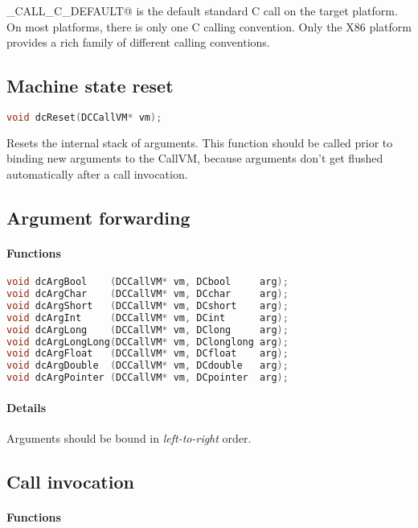 \lstinline@DC_CALL_C_DEFAULT@ is the default standard C call on the target platform.
On most platforms, there is only one C calling convention. Only the X86 platform
provides a rich family of different calling conventions.


\subsection{Machine state reset}

\begin{lstlisting}[language=c]
void dcReset(DCCallVM* vm);
\end{lstlisting}

Resets the internal stack of arguments. This function should be called prior 
to binding new arguments to the CallVM, because arguments don't get flushed
automatically after a call invocation.


\subsection{Argument forwarding}

\paragraph{Functions}

\begin{lstlisting}[language=c]
void dcArgBool    (DCCallVM* vm, DCbool     arg);
void dcArgChar    (DCCallVM* vm, DCchar     arg);
void dcArgShort   (DCCallVM* vm, DCshort    arg);
void dcArgInt     (DCCallVM* vm, DCint      arg);
void dcArgLong    (DCCallVM* vm, DClong     arg);
void dcArgLongLong(DCCallVM* vm, DClonglong arg);
void dcArgFloat   (DCCallVM* vm, DCfloat    arg);
void dcArgDouble  (DCCallVM* vm, DCdouble   arg);
void dcArgPointer (DCCallVM* vm, DCpointer  arg);
\end{lstlisting}

\paragraph{Details}

Arguments should be bound in \emph{left-to-right} order.

\subsection{Call invocation}

\paragraph{Functions}


